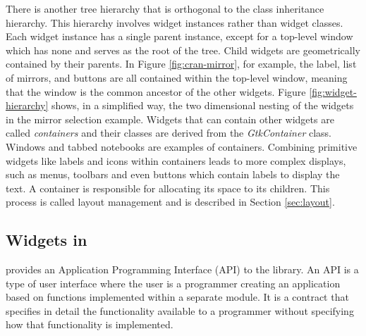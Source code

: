 \documentclass[article]{jss}
\begin{document}
There is another tree hierarchy that is orthogonal to the 
class inheritance hierarchy. This hierarchy involves widget instances
rather
than widget classes. Each widget instance has a single parent
instance, except
for a top-level window which has none and serves as the root of the
tree. Child widgets are geometrically
contained by their parents. In Figure \ref{fig:cran-mirror}, 
for example, the label, list of mirrors, and buttons are all contained
within the 
top-level window, meaning that the window is the common ancestor of
the other widgets.
Figure \ref{fig:widget-hierarchy} shows, in a simplified way, the two
dimensional
nesting of the widgets in the mirror selection example. Widgets that
can contain 
other widgets are called \emph{containers} and their classes are
derived from 
the \emph{GtkContainer} class. Windows and tabbed notebooks are
examples of containers.
Combining primitive widgets like labels and icons within containers
leads to more complex displays, such as menus, toolbars and even
buttons which contain labels to display the text. A container is 
responsible for allocating its space to its children. This process is
called
layout management and is described in Section \ref{sec:layout}.



\subsection[GTK+ Widgets in R]{ Widgets in }

 provides an Application Programming Interface (API) to the
library. An API is a type of user interface where the user
is a programmer creating an application based on functions implemented
within a separate module. It is a contract that specifies in detail
the functionality available to a programmer without specifying how
that functionality is implemented. 
 
\end{document}
